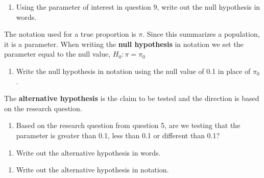 \documentclass[
]{report}
\providecommand{\tightlist}{%
  \setlength{\itemsep}{0pt}\setlength{\parskip}{0pt}}
\begin{document}
\vspace{1in}

\begin{enumerate}
\def\labelenumi{\arabic{enumi}.}
\setcounter{enumi}{9}
\tightlist
\item
  Using the parameter of interest in question 9, write out the null hypothesis in words.
\end{enumerate}

\vspace{1in}

\newpage

The notation used for a true proportion is \(\pi\). Since this summarizes a population, it is a parameter. When writing the \textbf{null hypothesis} in notation we set the parameter equal to the null value, \(H_0: \pi = \pi_0\)

\begin{enumerate}
\def\labelenumi{\arabic{enumi}.}
\setcounter{enumi}{10}
\tightlist
\item
  Write the null hypothesis in notation using the null value of 0.1 in place of \(\pi_0\).
\end{enumerate}

\vspace{0.5in}

The \textbf{alternative hypothesis} is the claim to be tested and the direction is based on the research question.

\begin{enumerate}
\def\labelenumi{\arabic{enumi}.}
\setcounter{enumi}{11}
\tightlist
\item
  Based on the research question from question 5, are we testing that the parameter is greater than 0.1, less than 0.1 or different than 0.1?
\end{enumerate}

\vspace{0.5in}

\begin{enumerate}
\def\labelenumi{\arabic{enumi}.}
\setcounter{enumi}{12}
\tightlist
\item
  Write out the alternative hypothesis in words.
\end{enumerate}

\vspace{1in}

\begin{enumerate}
\def\labelenumi{\arabic{enumi}.}
\setcounter{enumi}{13}
\tightlist
\item
  Write out the alternative hypothesis in notation.
\end{enumerate}
\end{document}

